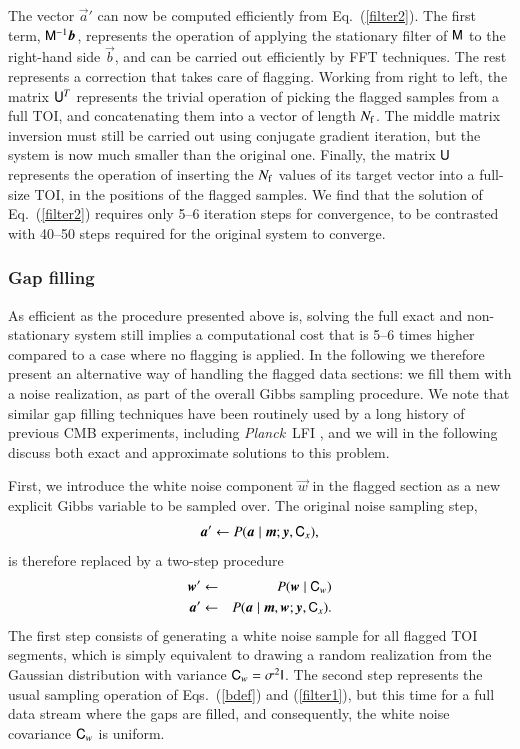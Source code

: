 \documentclass[twocolumn]{aa}
\newcommand{\ve}[1]{{\vec #1}}
\newcommand{\ma}[1]{\tens{#1}}
\newcommand{\pcal}{{P}}
\def\Planck{\textit{Planck}}
\begin{document}
The vector $\ve a'$ can now be computed efficiently from
Eq.~(\ref{filter2}).  The first term, $\ma M^{-1}\ve b$, represents
the operation of applying the stationary filter of $\ma M$ to the
right-hand side $\ve b$, and can be carried out efficiently by FFT
techniques.  The rest represents a correction that takes care of
flagging.  Working from right to left, the matrix $\ma U^T$ represents
the trivial operation of picking the flagged samples from a full TOI,
and concatenating them into a vector of length $N_{\rm f}$.  The
middle matrix inversion must still be carried out using
conjugate gradient iteration, but the system is now much smaller than
the original one.  Finally, the matrix $\ma U$ represents the
operation of inserting the $N_{\rm f}$ values of its target vector
into a full-size TOI, in the positions of the flagged samples. 
We find that the solution of Eq.~(\ref{filter2}) requires only 5--6 iteration
steps for convergence, to be contrasted with 40--50 steps required for
the original system to converge.


\subsubsection{Gap filling}
\label{sec:gapfill}

As efficient as the procedure presented above is, solving the full
exact and non-stationary system still implies a computational cost
that is 5--6 times higher compared to a case where no flagging is
applied. In the following we therefore present an alternative way of
handling the flagged data sections: we fill them with a noise
realization, as part of the overall Gibbs sampling procedure. We note
that similar gap filling techniques have been routinely used by a long
history of previous CMB experiments, including \Planck\ LFI
\citep[e.g.,][]{planck2013-p02}, and we will in the following discuss
both exact and approximate solutions to this problem.

First, we introduce the white noise component $\ve w$ in the flagged
section as a new explicit Gibbs variable to be sampled over.  The
original noise sampling step,
\begin{equation}
 \ve{a'}  \leftarrow\pcal(\ve a \mid \ve{m};\ve y,\ma C_x),
\end{equation}
%
is therefore replaced by a two-step procedure
%
\begin{eqnarray}
 \ve{w'}  &\leftarrow& \pcal(\ve w \mid \ma C_w)   \nonumber \\
 \ve{a'}  &\leftarrow& \pcal(\ve a \mid \ve{m},\ve w;\ve y,\ma C_x).
\end{eqnarray}
%
The first step consists of generating a white noise sample for all
flagged TOI segments, which is simply equivalent to drawing a random
realization from the Gaussian distribution with variance $\ma
C_w=\sigma^2\ma I$.  The second step represents the usual sampling
operation of Eqs.~(\ref{bdef}) and (\ref{filter1}), but this time for a
full data stream where the gaps are filled, and consequently, the
white noise covariance $\ma C_w$ is uniform.
\end{document}
